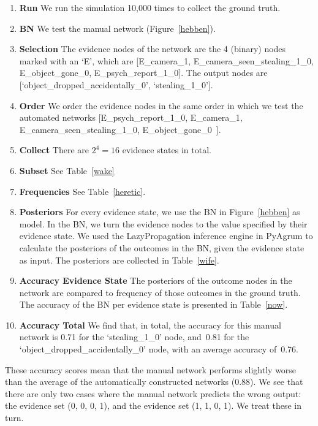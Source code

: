 \documentclass[12pt]{article}
\begin{document}
\begin{enumerate}
\item \textbf{Run} We run the simulation 10,000 times to collect the ground truth.
\item \textbf{BN} We test the manual network (Figure~\ref{hebben}).
\item \textbf{Selection} The evidence nodes of the network are the 4 (binary) nodes marked with an `E', which are [E\_camera\_1, E\_camera\_seen\_stealing\_1\_0, E\_object\_gone\_0, E\_psych\_report\_1\_0]. The output nodes are [`object\_dropped\_accidentally\_0', `stealing\_1\_0'].
\item \textbf{Order} We order the evidence nodes in the same order in which we test the automated networks [E\_psych\_report\_1\_0, E\_camera\_1,  E\_camera\_seen\_stealing\_1\_0, E\_object\_gone\_0~].
\item \textbf{Collect} There are $2^4 = 16$ evidence states in total.
\item \textbf{Subset} See Table~\ref{wake}
\item \textbf{Frequencies} See Table~\ref{heretic}.
\item \textbf{Posteriors} For every evidence state, we use the BN in Figure~\ref{hebben} as model. In the BN, we turn the evidence nodes to the value specified by their evidence state. We used the LazyPropagation inference engine in PyAgrum to calculate the posteriors of the outcomes in the BN, given the evidence state as input. The posteriors are collected in Table~\ref{wife}. 
\item \textbf{Accuracy Evidence State} The posteriors of the outcome nodes in the network are compared to frequency of those outcomes in the ground truth. The accuracy of the BN per evidence state is presented in Table~\ref{now}.
\item \textbf{Accuracy Total} We find that, in total, the accuracy for this manual network is 0.71 for the `stealing\_1\_0' node, and~0.81 for the `object\_dropped\_accidentally\_0' node, with an average accuracy of~0.76. 
\end{enumerate}

These accuracy scores mean that the manual network performs slightly worse than the average of the automatically constructed networks (0.88). We see that there are only two cases where the manual network predicts the wrong output: the evidence set (0, 0, 0, 1), and the evidence set (1, 1, 0, 1). We treat these in turn.
\end{document}

